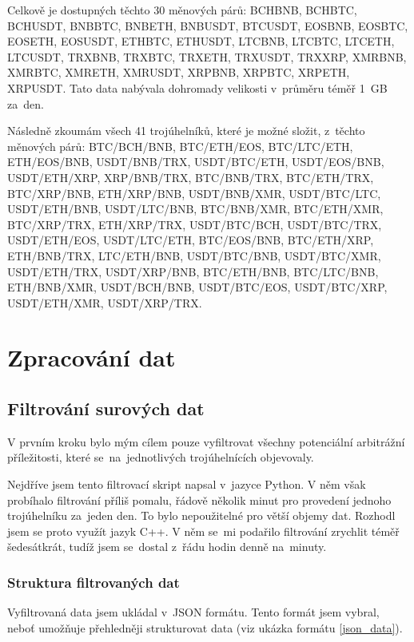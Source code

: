\documentclass[thesis=B,czech]{FITthesis}[2019/03/21]
\begin{document}
Celkově je dostupných těchto 30 měnových párů: BCHBNB, BCHBTC, BCHUSDT, BNBBTC, BNBETH, BNBUSDT, BTCUSDT, EOSBNB,  \linebreak EOSBTC, EOSETH, EOSUSDT, ETHBTC, ETHUSDT, LTCBNB, LTCBTC, LTCETH, LTCUSDT, TRXBNB, TRXBTC, TRXETH, TRXUSDT,  \linebreak TRXXRP, XMRBNB, XMRBTC, XMRETH, XMRUSDT, XRPBNB,  \linebreak XRPBTC, XRPETH, XRPUSDT. Tato data nabývala dohromady velikosti v~průměru téměř 1~GB za~den.

Následně zkoumám všech 41 trojúhelníků, které je možné složit, z~těchto měnových párů: BTC/BCH/BNB, BTC/ETH/EOS, BTC/LTC/ETH,  \linebreak ETH/EOS/BNB, USDT/BNB/TRX, USDT/BTC/ETH, USDT/EOS/BNB, USDT/ETH/XRP, XRP/BNB/TRX, BTC/BNB/TRX, BTC/ETH/TRX,  \linebreak BTC/XRP/BNB, ETH/XRP/BNB, USDT/BNB/XMR, USDT/BTC/LTC, USDT/ETH/BNB, USDT/LTC/BNB, BTC/BNB/XMR, BTC/ETH/XMR, BTC/XRP/TRX, ETH/XRP/TRX, USDT/BTC/BCH, USDT/BTC/TRX, USDT/ETH/EOS, USDT/LTC/ETH, BTC/EOS/BNB, BTC/ETH/XRP,  \linebreak ETH/BNB/TRX, LTC/ETH/BNB, USDT/BTC/BNB, USDT/BTC/XMR, USDT/ETH/TRX, USDT/XRP/BNB, BTC/ETH/BNB, BTC/LTC/BNB, ETH/BNB/XMR, USDT/BCH/BNB, USDT/BTC/EOS, USDT/BTC/XRP, USDT/ETH/XMR, USDT/XRP/TRX.

\section{Zpracování dat}
\subsection{Filtrování surových dat}
V prvním kroku bylo mým cílem pouze vyfiltrovat všechny potenciální arbitrážní příležitosti, které se~na~jednotlivých trojúhelnících objevovaly.

Nejdříve jsem tento filtrovací skript napsal v~jazyce Python. V něm však probíhalo filtrování příliš pomalu, řádově několik minut pro provedení jednoho trojúhelníku za~jeden den. To bylo nepoužitelné pro větší objemy dat. Rozhodl jsem se proto využít jazyk C++. V něm se~mi podařilo filtrování zrychlit téměř šedesátkrát, tudíž jsem se~dostal z~řádu hodin denně na~minuty.

\subsubsection{Struktura filtrovaných dat}
Vyfiltrovaná data jsem ukládal v~JSON formátu. Tento formát jsem vybral, neboť umožňuje přehledněji strukturovat data (viz ukázka formátu \ref{json_data}).
\end{document}
